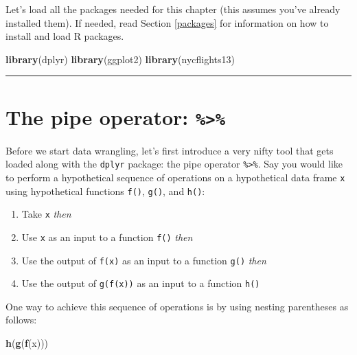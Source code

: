 \documentclass[12pt, krantz2,]{krantz}
\makeatletter
\newenvironment{Shaded}{\begin{snugshade}}{\end{snugshade}}
\newcommand{\KeywordTok}[1]{\textcolor[rgb]{0.27,0.27,0.27}{\textbf{#1}}}
\newcommand{\NormalTok}[1]{#1}
\providecommand{\tightlist}{%
  \setlength{\itemsep}{0pt}\setlength{\parskip}{0pt}}
\newenvironment{kframe}{%
\medskip{}
\setlength{\fboxsep}{.8em}
 \def\at@end@of@kframe{}%
 \ifinner\ifhmode%
  \def\at@end@of@kframe{\end{minipage}}%
  \begin{minipage}{\columnwidth}%
 \fi\fi%
 \def\FrameCommand##1{\hskip\@totalleftmargin \hskip-\fboxsep
 \colorbox{shadecolor}{##1}\hskip-\fboxsep
     \hskip-\linewidth \hskip-\@totalleftmargin \hskip\columnwidth}%
 \MakeFramed {\advance\hsize-\width
   \@totalleftmargin\z@ \linewidth\hsize
   \@setminipage}}%
 {\par\unskip\endMakeFramed%
 \at@end@of@kframe}
\renewenvironment{Shaded}{\begin{kframe}}{\end{kframe}}
\makeatother
\begin{document}
Let's load all the packages needed for this chapter (this assumes you've already installed them). If needed, read Section \ref{packages} for information on how to install and load R packages.

\begin{Shaded}
\begin{Highlighting}[]
\KeywordTok{library}\NormalTok{(dplyr)}
\KeywordTok{library}\NormalTok{(ggplot2)}
\KeywordTok{library}\NormalTok{(nycflights13)}
\end{Highlighting}
\end{Shaded}

\begin{center}\rule{0.5\linewidth}{\linethickness}\end{center}

\hypertarget{piping}{%
\section{\texorpdfstring{The pipe operator: \texttt{\%\textgreater{}\%}}{The pipe operator: \%\textgreater{}\%}}\label{piping}}

Before we start data wrangling, let's first introduce a very nifty tool that gets loaded along with the \texttt{dplyr} package: the pipe operator \texttt{\%\textgreater{}\%}. Say you would like to perform a hypothetical sequence of operations on a hypothetical data frame \texttt{x} using hypothetical functions \texttt{f()}, \texttt{g()}, and \texttt{h()}:

\begin{enumerate}
\def\labelenumi{\arabic{enumi}.}
\tightlist
\item
  Take \texttt{x} \emph{then}
\item
  Use \texttt{x} as an input to a function \texttt{f()} \emph{then}
\item
  Use the output of \texttt{f(x)} as an input to a function \texttt{g()} \emph{then}
\item
  Use the output of \texttt{g(f(x))} as an input to a function \texttt{h()}
\end{enumerate}

One way to achieve this sequence of operations is by using nesting parentheses as follows:

\begin{Shaded}
\begin{Highlighting}[]
\KeywordTok{h}\NormalTok{(}\KeywordTok{g}\NormalTok{(}\KeywordTok{f}\NormalTok{(x)))}
\end{Highlighting}
\end{Shaded}
\end{document}
